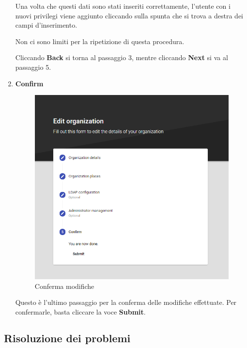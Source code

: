 \documentclass[../manuale-utente.tex]{subfiles}
\begin{document}
\begin{enumerate}
    Una volta che questi dati sono stati inseriti correttamente, l'utente con i nuovi privilegi viene aggiunto cliccando sulla spunta che si trova a destra dei campi d'inserimento.

    Non ci sono limiti per la ripetizione di questa procedura.

    Cliccando \textbf{Back} si torna al passaggio 3, mentre cliccando \textbf{Next} si va al passaggio 5.

    \newpage
    \item \textbf{Confirm}
    
    \begin{figure}[H]
        \centering
        \includegraphics[width=120mm]{img/web-app/edit-organization/5-conferma-modifiche.png}
        \caption{Conferma modifiche}%
        \label{fig:web_app_conferma_modifiche}
    \end{figure}

    Questo è l'ultimo passaggio per la conferma delle modifiche effettuate. Per confermarle, basta cliccare la voce \textbf{Submit}.

\end{enumerate}
\newpage


\subsection{Risoluzione dei problemi}%
\label{subs:web_app_risoluzione_problemi}
\end{document}
